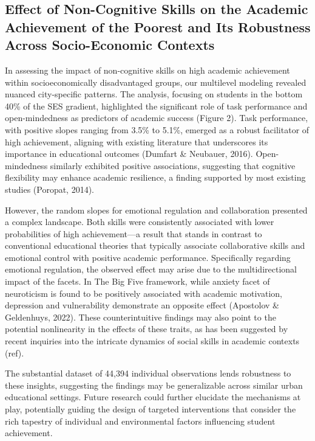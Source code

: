 \documentclass[
  12pt,
  a4paper,
]{article}
\begin{document}
\hypertarget{effect-of-non-cognitive-skills-on-the-academic-achievement-of-the-poorest-and-its-robustness-across-socio-economic-contexts}{%
\subsection{Effect of Non-Cognitive Skills on the Academic Achievement
of the Poorest and Its Robustness Across Socio-Economic
Contexts}\label{effect-of-non-cognitive-skills-on-the-academic-achievement-of-the-poorest-and-its-robustness-across-socio-economic-contexts}}

In assessing the impact of non-cognitive skills on high academic
achievement within socioeconomically disadvantaged groups, our
multilevel modeling revealed nuanced city-specific patterns. The
analysis, focusing on students in the bottom 40\% of the SES gradient,
highlighted the significant role of task performance and open-mindedness
as predictors of academic success (Figure 2). Task performance, with
positive slopes ranging from 3.5\% to 5.1\%, emerged as a robust
facilitator of high achievement, aligning with existing literature that
underscores its importance in educational outcomes (Dumfart \& Neubauer,
2016). Open-mindedness similarly exhibited positive associations,
suggesting that cognitive flexibility may enhance academic resilience, a
finding supported by most existing studies (Poropat, 2014).

However, the random slopes for emotional regulation and collaboration
presented a complex landscape. Both skills were consistently associated
with lower probabilities of high achievement---a result that stands in
contrast to conventional educational theories that typically associate
collaborative skills and emotional control with positive academic
performance. Specifically regarding emotional regulation, the observed
effect may arise due to the multidirectional impact of the facets. In
The Big Five framework, while anxiety facet of neuroticism is found to
be positively associated with academic motivation, depression and
vulnerability demonstrate an opposite effect (Apostolov \& Geldenhuys,
2022). These counterintuitive findings may also point to the potential
nonlinearity in the effects of these traits, as has been suggested by
recent inquiries into the intricate dynamics of social skills in
academic contexts (ref).

The substantial dataset of 44,394 individual observations lends
robustness to these insights, suggesting the findings may be
generalizable across similar urban educational settings. Future research
could further elucidate the mechanisms at play, potentially guiding the
design of targeted interventions that consider the rich tapestry of
individual and environmental factors influencing student achievement.
\end{document}
